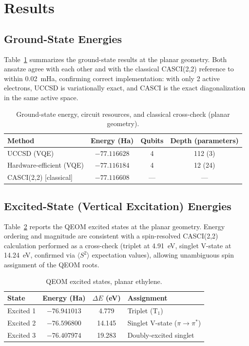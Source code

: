 \documentclass[10pt]{article}
\begin{document}
\section{Results}

\subsection{Ground-State Energies}
Table~\ref{tab:gs} summarizes the ground-state results at the planar geometry.
Both ansatze agree with each other and with the classical CASCI(2,2)
reference to within 0.02~mHa, confirming correct implementation: with only 2
active electrons, UCCSD is variationally exact, and CASCI is the exact
diagonalization in the same active space.

\begin{table}[h]
\centering
\caption{Ground-state energy, circuit resources, and classical cross-check
(planar geometry).}
\label{tab:gs}
\begin{tabular}{lccc}
\toprule
Method & Energy (Ha) & Qubits & Depth (parameters) \\
\midrule
UCCSD (VQE) & $-77.116628$ & 4 & 112 (3) \\
Hardware-efficient (VQE)\footnotemark & $-77.116184$ & 4 & 12 (24) \\
CASCI(2,2) [classical] & $-77.116608$ & --- & --- \\
\bottomrule
\end{tabular}
\end{table}

\subsection{Excited-State (Vertical Excitation) Energies}
Table~\ref{tab:excited} reports the QEOM excited states at the planar
geometry. Energy ordering and magnitude are consistent with a spin-resolved
CASCI(2,2) calculation performed as a cross-check (triplet at 4.91~eV,
singlet V-state at 14.24~eV, confirmed via $\langle S^2\rangle$
expectation values), allowing unambiguous spin assignment of the QEOM roots.

\begin{table}[h]
\centering
\caption{QEOM excited states, planar ethylene.}
\label{tab:excited}
\begin{tabular}{lccl}
\toprule
State & Energy (Ha) & $\Delta E$ (eV) & Assignment \\
\midrule
Excited 1 & $-76.941013$ & 4.779 & Triplet (T$_1$) \\
Excited 2 & $-76.596800$ & 14.145 & Singlet V-state ($\pi\to\pi^*$) \\
Excited 3 & $-76.407974$ & 19.283 & Doubly-excited singlet \\
\bottomrule
\end{tabular}
\end{table}
\end{document}
